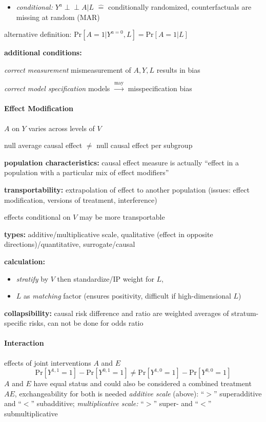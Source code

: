 \documentclass[8pt,twoside]{extarticle}
\newcommand{\indep}{\perp \!\!\! \perp}
\begin{document}
\begin{multicols}{2}
\begin{itemize}[itemsep=0em, topsep=0pt, partopsep=0pt,parsep=0pt, leftmargin=1.5em]
\item \textit{conditional:} $Y^a {\indep} A|L$ $\widehat{=}$ conditionally randomized, counterfactuals are missing at random (MAR)
\end{itemize}
alternative definition: $ \mathrm{Pr}\left[A=1|Y^{a=0}, L\right] = \mathrm{Pr}\left[A=1|L\right]$

 \textbf{additional conditions:}

 \textit{correct measurement} mismeasurement of $A, Y, L$ results in bias

 \textit{correct model specification} models $\overset{\text{may}}{\rightarrow}$ misspecification bias




\paragraph{Effect Modification} $A$ on $Y$ varies across levels of $V$

 null average causal effect $\neq$ null causal effect per subgroup

 \textbf{population characteristics:} causal effect measure is actually ``effect in a population with a particular mix of effect modifiers''

 \textbf{transportability:} extrapolation of effect to another population (issues: effect modification, versions of treatment, interference)

 effects conditional on $V$ may be more transportable

 \textbf{types:} additive/multiplicative scale,
qualitative (effect in opposite directions)/quantitative, surrogate/causal 


 \textbf{calculation:} 
\begin{itemize}[itemsep=0em, topsep=0pt, partopsep=0pt,parsep=0pt, leftmargin=1.5em]
\setlength{\itemsep}{0pt}%
\setlength{\parskip}{0pt}
\item \textit{stratify} by $V$ then standardize/IP weight for $L$, 
\item $L$ as \textit{matching} factor (ensures positivity, difficult if high-dimensional $L$)
\end{itemize}

 \textbf{collapsibility:}  causal risk difference and ratio are weighted averages of stratum-specific risks, can not be done for odds ratio



\paragraph{Interaction} effects of joint interventions $A$ and $E$ 
$$\mathrm{Pr}\left[Y^{1,1}{=}1\right] - \mathrm{Pr}\left[Y^{0,1}{=}1\right] \neq \mathrm{Pr}\left[Y^{1,0}{=}1\right] - \mathrm{Pr}\left[Y^{0,0}{=}1\right]$$
$A$ and $E$ have equal status and could also be considered a combined treatment $AE$, exchangeability for both is needed
\textit{additive scale} (above): ``$>$'' superadditive and ``$<$'' subadditive;
\textit{multiplicative scale:} ``$>$'' super- and ``$<$'' submultiplicative


\end{multicols}
\end{document}
